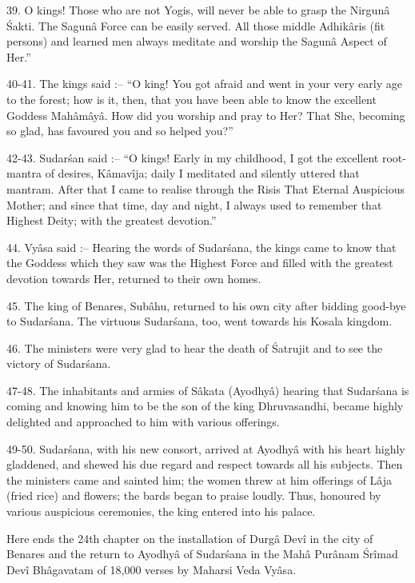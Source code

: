 39. O kings! Those who are not Yogis, will never be able to grasp the Nirgun\^a \'Sakti. The Sagun\^a Force can be easily served. All those middle Adhik\^aris (fit persons) and learned men always meditate and worship the Sagun\^a Aspect of Her.''

40-41. The kings said :-- ``O king! You got afraid and went in your very early age to the forest; how is it, then, that you have been able to know the excellent Goddess Mah\^am\^ay\^a. How did you worship and pray to Her? That She, becoming so glad, has favoured you and so helped you?''

42-43. Sudar\'san said :-- ``O kings! Early in my childhood, I got the excellent root-mantra of desires, K\^amav\^ija; daily I meditated and silently uttered that mantram. After that I came to realise through the Risis That Eternal Auspicious Mother; and since that time, day and night, I always used to remember that Highest Deity; with the greatest devotion.''

44. Vy\^asa said :-- Hearing the words of Sudar\'sana, the kings came to know that the Goddess which they saw was the Highest Force and filled with the greatest devotion towards Her, returned to their own homes.

45. The king of Benares, Sub\^ahu, returned to his own city after bidding good-bye to Sudar\'sana. The virtuous Sudar\'sana, too, went towards his Kosala kingdom.

46. The ministers were very glad to hear the death of \'Satrujit and to see the victory of Sudar\'sana.

47-48. The inhabitants and armies of S\^akata (Ayodhy\^a) hearing that Sudar\'sana is coming and knowing him to be the son of the king Dhruvasandhi, became highly delighted and approached to him with various offerings.

49-50. Sudar\'sana, with his new consort, arrived at Ayodhy\^a with his heart highly gladdened, and shewed his due regard and respect towards all his subjects. Then the ministers came and sainted him; the women threw at him offerings of L\^aja (fried rice) and flowers; the bards began to praise loudly. Thus, honoured by various auspicious ceremonies, the king entered into his palace.

Here ends the 24th chapter on the installation of Durg\^a Dev\^i in the city of Benares and the return to Ayodhy\^a of Sudar\'sana in the Mah\^a Pur\^anam \'Sr\^imad Dev\^i Bh\^agavatam of 18,000 verses by Maharsi Veda Vy\^asa.

